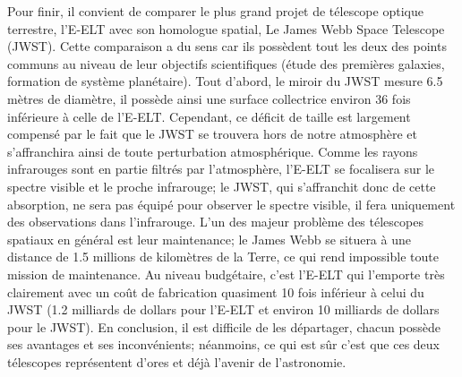 Pour finir, il convient de comparer le plus grand projet de télescope optique terrestre, l'E-ELT avec son homologue spatial, Le James Webb Space Telescope (JWST). Cette comparaison a du sens car ils possèdent tout les deux des points communs au niveau de leur objectifs scientifiques (étude des premières galaxies, formation de système planétaire). Tout d'abord, le miroir du JWST mesure 6.5 mètres de diamètre, il possède ainsi une surface collectrice environ 36 fois inférieure à celle de l'E-ELT. Cependant, ce déficit de taille est largement compensé par le fait que le JWST se trouvera hors de notre atmosphère et s'affranchira ainsi de toute perturbation atmosphérique. Comme les rayons infrarouges sont en partie filtrés par l'atmosphère, l'E-ELT se focalisera sur le spectre visible et le proche infrarouge; le JWST, qui s'affranchit donc de cette absorption, ne sera pas équipé pour observer le spectre visible, il fera uniquement des observations dans l'infrarouge. L'un des majeur problème des télescopes spatiaux en général est leur maintenance; le James Webb se situera à une distance de 1.5 millions de kilomètres de la Terre, ce qui rend impossible toute mission de maintenance. Au niveau budgétaire, c'est l'E-ELT qui l'emporte très clairement avec un coût de fabrication quasiment 10 fois inférieur à celui du JWST (1.2 milliards de dollars pour l'E-ELT et environ 10 milliards de dollars pour le JWST). En conclusion, il est difficile de les départager, chacun possède ses avantages et ses inconvénients; néanmoins, ce qui est sûr c'est que ces deux télescopes représentent d'ores et déjà l'avenir de l'astronomie. 